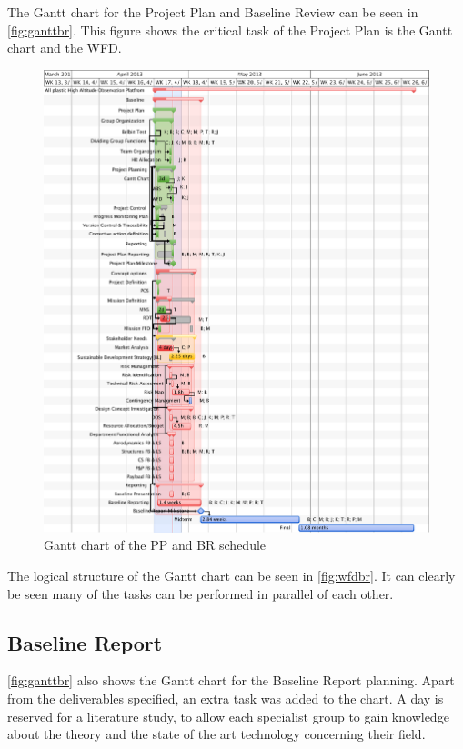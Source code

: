 \documentclass[a4paper]{report}
\begin{document}
The Gantt chart for the Project Plan and Baseline Review can be seen in \autoref{fig:ganttbr}. This figure shows the critical task of the Project Plan is the Gantt chart and the WFD.
\begin{figure}[h]
	\centering
	
	\includegraphics[width=\textheight, angle=270]{Figures/BASEGANTT.PDF}
	\caption{Gantt chart of the PP and BR schedule}
	\label{fig:ganttbr}
	
\end{figure}
The logical structure of the Gantt chart can be seen in \autoref{fig:wfdbr}. It can clearly be seen many of the tasks can be performed in parallel of each other. 

\subsection{Baseline Report}
\autoref{fig:ganttbr} also shows the Gantt chart for the Baseline Report planning. Apart from the deliverables specified, an extra task was added to the chart. A day is reserved for a literature study, to allow each specialist group to gain knowledge about the theory and the state of the art technology concerning their field. \newline
\end{document}
